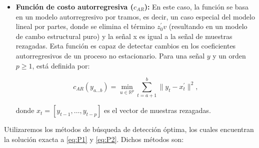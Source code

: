 \documentclass{article}[14pts]
\begin{document}
\begin{itemize}
        \item \textbf{Función de costo autorregresiva ($c_{AR}$): } En este caso, la función se basa en un modelo autorregresivo por tramos, es decir, un caso especial del modelo lineal por partes, donde se elimina el término $z_{0}^{'}v$ (resultando en un modelo de cambo estructural puro) y la señal x es igual a la señal de muestras rezagadas. Esta función es capaz de detectar cambios en los coeficientes autorregresivos de un proceso no estacionario. Para una señal $y$ y un orden $p \geq 1$, está definida por:
          
          \begin{equation}
            c_{AR}(y_{a \dots b}) = \min_{u \in \mathbb{R}^{p}} \sum_{t= a+1}^{b} \| y_{t} - x_{t}^{'} \|^{2},
          \end{equation}
          
        donde $x_{t}= [y_{t-1}, \dots, y_{t-p}]$ es el vector de muestras rezagadas.

      \end{itemize}

    Utilizaremos los métodos de búsqueda de detección óptima, los cuales encuentran la solución exacta a \eqref{eq:P1} y \eqref{eq:P2}. Dichos métodos son:
\end{document}
